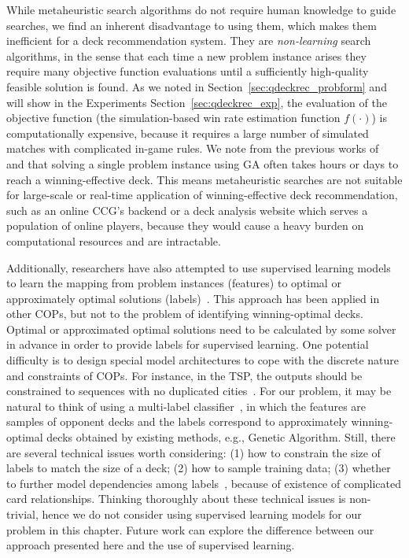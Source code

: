 While metaheuristic search algorithms do not require human knowledge to guide searches, we find an inherent disadvantage to using them, which makes them inefficient for a deck recommendation system. They are \textit{non-learning} search algorithms, in the sense that each time a new problem instance arises they require many objective function evaluations until a sufficiently high-quality feasible solution is found. As we noted in Section~\ref{sec:qdeckrec_probform} and will show in the Experiments Section~\ref{sec:qdeckrec_exp}, the evaluation of the objective function (the simulation-based win rate estimation function $f(\cdot)$) is computationally expensive, because it requires a large number of simulated matches with complicated in-game rules. We note from the previous works of ~\textcite{garcia2016evolutionary} and \textcite{bjorke2017deckbuilding} that solving a single problem instance using GA often takes hours or days to reach a winning-effective deck. This means metaheuristic searches are not suitable for large-scale or real-time application of winning-effective deck recommendation, such as an online CCG's backend or a deck analysis website which serves a population of online players, because they would cause a heavy burden on computational resources and are intractable.


Additionally, researchers have also attempted to use supervised learning models to learn the mapping from problem instances (features) to optimal or approximately optimal solutions (labels)~\citep{vinyals2015pointer}. This approach has been applied in other COPs, but not to the problem of identifying winning-optimal decks. Optimal or approximated optimal solutions need to be calculated by some solver in advance in order to provide labels for supervised learning. One potential difficulty is to design special model architectures to cope with the discrete nature and constraints of COPs. For instance, in the TSP, the outputs should be constrained to sequences with no duplicated cities~\citep{vinyals2015pointer}. For our problem, it may be natural to think of using a multi-label classifier~\citep{tsoumakas2007multi}, in which the features are samples of opponent decks and the labels correspond to approximately winning-optimal decks obtained by existing methods, e.g., Genetic Algorithm. Still, there are several technical issues worth considering: (1) how to constrain the size of labels to match the size of a deck; (2) how to sample training data; (3) whether to further model dependencies among labels~\citep{zhang2010multi}, because of existence of complicated card relationships. Thinking thoroughly about these technical issues is non-trivial, hence we do not consider using supervised learning models for our problem in this chapter. Future work can explore the difference between our approach presented here and the use of supervised learning. 


